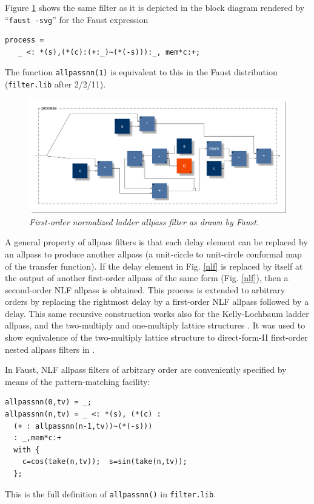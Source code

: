 \documentclass[twoside,a4paper]{article}
\begin{document}
Figure \ref{nlf1} shows the same filter as it is depicted in the block diagram
rendered by ``\texttt{faust -svg}'' for the Faust expression
\begin{verbatim}
process = 
   _ <: *(s),(*(c):(+:_)~(*(-s))):_, mem*c:+;
\end{verbatim}
The function \texttt{allpassnn(1)} is equivalent to this in the Faust
distribution (\texttt{filter.lib} after 2/2/11).

\begin{figure}[ht]
\centerline{\includegraphics[scale=0.33]{fig/nlf1.pdf}}
\caption{\label{nlf1}{\it First-order normalized ladder allpass filter as drawn by Faust.}}
\end{figure}

A general property of allpass filters is that each delay element can
be replaced by an allpass to produce another allpass (a
unit-circle to unit-circle conformal map of the transfer function).  If the
delay element in Fig.{} \ref{nlf} is replaced by itself at the output
of another first-order allpass of the same form (Fig.{} \ref{nlf}),
then a second-order NLF allpass is obtained.  This process is extended
to arbitrary orders by replacing the rightmost delay by a first-order
NLF allpass followed by a delay.  This same recursive construction
works also for the Kelly-Lochbaum ladder allpass, and the
two-multiply and one-multiply lattice structures \cite{MG,PASP}.
It was used to show equivalence of the two-multiply lattice structure
to direct-form-II first-order nested allpass filters in
\cite{MassieAES93,MG}.  

In Faust, NLF allpass filters of arbitrary order are conveniently
specified by means of the pattern-matching facility:
\begin{samepage}
\begin{verbatim}
allpassnn(0,tv) = _;
allpassnn(n,tv) = _ <: *(s), (*(c) : 
  (+ : allpassnn(n-1,tv))~(*(-s))) 
  : _,mem*c:+
  with { 
    c=cos(take(n,tv));  s=sin(take(n,tv)); 
  };
\end{verbatim}
\end{samepage}
This is the full definition of \texttt{allpassnn()} in 
\texttt{filter.lib}.
\end{document}
